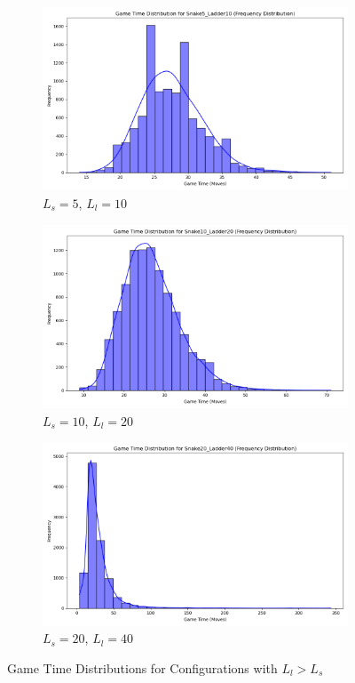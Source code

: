 \documentclass[12pt]{report}
\begin{document}
	\begin{figure}[h]
		\centering
		\begin{subfigure}[b]{0.32\textwidth} 
			\includegraphics[width=\linewidth]{../withLength/UnequalLengths/game_time_distribution_Snake5_Ladder10}
			\caption{$L_s = 5$, $L_l = 10$}
		\end{subfigure}
		\hfill
		\begin{subfigure}[b]{0.32\textwidth}  
			\includegraphics[width=\linewidth]{../withLength/UnequalLengths/game_time_distribution_Snake10_Ladder20}
			\caption{$L_s = 10$, $L_l = 20$}
		\end{subfigure}
		\hfill
		\begin{subfigure}[b]{0.32\textwidth}  
			\includegraphics[width=\linewidth]{../withLength/UnequalLengths/game_time_distribution_Snake20_Ladder40}
			\caption{$L_s = 20$, $L_l = 40$}
		\end{subfigure}
		\caption{Game Time Distributions for Configurations with $L_l>L_s$}
	\end{figure}
	
\end{document}
